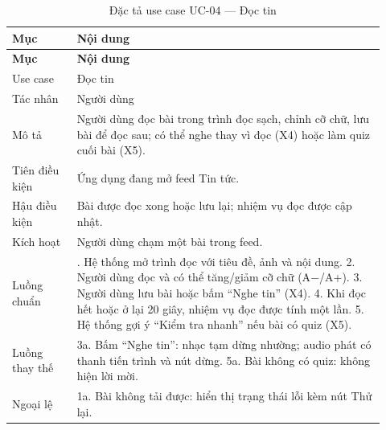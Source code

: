\begingroup\small\renewcommand{\arraystretch}{1.15}\setlength{\tabcolsep}{3pt}
\begin{longtable}{>{\RaggedRight\arraybackslash}p{0.16\linewidth}>{\RaggedRight\arraybackslash}p{0.76\linewidth}}
\caption{Đặc tả use case UC-04 --- Đọc tin}
\label{tab:spec-uc-04}\\
\toprule
\textbf{Mục} & \textbf{Nội dung} \\
\midrule
\endfirsthead
\toprule
\textbf{Mục} & \textbf{Nội dung} \\
\midrule
\endhead
\bottomrule
\endfoot
Use case & Đọc tin \\
Tác nhân & Người dùng \\
Mô tả & Người dùng đọc bài trong trình đọc sạch, chỉnh cỡ chữ, lưu bài để đọc sau; có thể nghe thay vì đọc (X4) hoặc làm quiz cuối bài (X5). \\
Tiên điều kiện & Ứng dụng đang mở feed Tin tức. \\
Hậu điều kiện & Bài được đọc xong hoặc lưu lại; nhiệm vụ đọc được cập nhật. \\
Kích hoạt & Người dùng chạm một bài trong feed. \\
Luồng chuẩn & 1. Hệ thống mở trình đọc với tiêu đề, ảnh và nội dung. 2. Người dùng đọc và có thể tăng/giảm cỡ chữ (A$- $/A+). 3. Người dùng lưu bài hoặc bấm “Nghe tin” (X4). 4. Khi đọc hết hoặc ở lại 20 giây, nhiệm vụ đọc được tính một lần. 5. Hệ thống gợi ý “Kiểm tra nhanh” nếu bài có quiz (X5). \\
Luồng thay thế & 3a. Bấm “Nghe tin”: nhạc tạm dừng nhường; audio phát có thanh tiến trình và nút dừng. 5a. Bài không có quiz: không hiện lời mời. \\
Ngoại lệ & 1a. Bài không tải được: hiển thị trạng thái lỗi kèm nút Thử lại. \\
\end{longtable}
\endgroup

